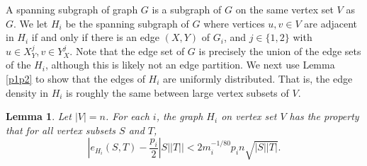 \documentclass[11pt]{article}
\newtheorem{lemma}{Lemma}[section]
\begin{document}
A spanning subgraph of graph $G$ is a subgraph of $G$ on the same vertex set
$V$ as $G$.
We let $H_i$ be the spanning subgraph of $G$ where vertices $u,v \in V$ are
adjacent in $H_i$ if and only if there is an edge $(X,Y)$ of $G_i$, and $j \in
\{1,2\}$ with $u \in X^j_Y, v\in Y^j_X$. Note that the edge set of $G$ is
precisely the union of the edge sets of the $H_i$, although this is likely not
an edge partition. We next use Lemma \ref{p1p2} to show that the edges of $H_i$
are uniformly distributed. That is, the edge density in $H_i$ is roughly the
same between large vertex subsets of $V$.

\begin{lemma}\label{Hiuniform}
Let $|V|=n$. For each $i$, the graph $H_i$ on vertex set $V$ has the property
that for all vertex subsets $S$ and $T$,
$$|e_{H_i}(S,T)-\frac{p_i}{2}|S||T||<2m_i^{-1/80}p_in\sqrt{|S||T|}.$$
\end{lemma}
\end{document}
